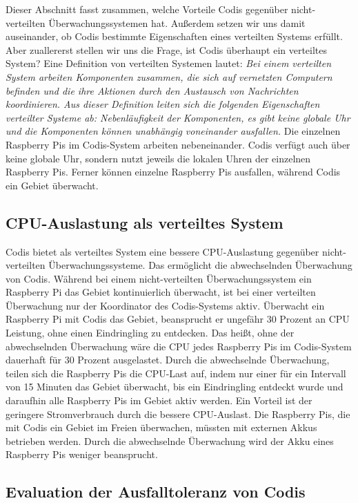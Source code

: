 \documentclass[journal]{IEEEtran}
\begin{document}
Dieser Abschnitt fasst zusammen, welche Vorteile Codis gegenüber nicht-verteilten Überwachungssystemen hat. Außerdem setzen wir uns damit auseinander, ob Codis bestimmte Eigenschaften eines verteilten Systems erfüllt. Aber zuallererst stellen wir uns die Frage, ist Codis überhaupt ein verteiltes System? Eine Definition von verteilten Systemen lautet: \textit{Bei einem verteilten System arbeiten Komponenten zusammen, die sich auf vernetzten Computern befinden und die ihre Aktionen durch den Austausch von Nachrichten koordinieren. Aus dieser Definition leiten sich die folgenden Eigenschaften verteilter Systeme ab: Nebenläufigkeit der Komponenten, es gibt keine globale Uhr und die Komponenten können unabhängig voneinander ausfallen.}\cite[S. 17]{verteilte2} Die einzelnen Raspberry Pis im Codis-System arbeiten nebeneinander. Codis verfügt auch über keine globale Uhr, sondern nutzt jeweils die lokalen Uhren der einzelnen Raspberry Pis. Ferner können einzelne Raspberry Pis ausfallen, während Codis ein Gebiet überwacht.

\subsection{CPU-Auslastung als verteiltes System}

Codis bietet als verteiltes System eine bessere CPU-Auslastung gegenüber nicht-verteilten Überwachungssysteme. Das ermöglicht die abwechselnden Überwachung von Codis. Während bei einem nicht-verteilten Überwachungssystem ein Raspberry Pi das Gebiet kontinuierlich überwacht, ist bei einer verteilten Überwachung nur der Koordinator des Codis-Systems aktiv. Überwacht ein Raspberry Pi mit Codis das Gebiet, beansprucht er ungefähr 30 Prozent an CPU Leistung, ohne einen Eindringling zu entdecken. Das heißt, ohne der abwechselnden Überwachung wäre die CPU jedes Raspberry Pis im Codis-System dauerhaft für 30 Prozent ausgelastet. Durch die abwechselnde Überwachung, teilen sich die Raspberry Pis die CPU-Last auf, indem nur einer für ein Intervall von 15 Minuten das Gebiet überwacht, bis ein Eindringling entdeckt wurde und daraufhin alle Raspberry Pis im Gebiet aktiv werden. Ein Vorteil ist der geringere Stromverbrauch durch die bessere CPU-Auslast. Die Raspberry Pis, die mit Codis ein Gebiet im Freien überwachen, müssten mit externen Akkus betrieben werden. Durch die abwechselnde Überwachung wird der Akku eines Raspberry Pis weniger beansprucht.

\subsection{Evaluation der Ausfalltoleranz von Codis}
\end{document}

